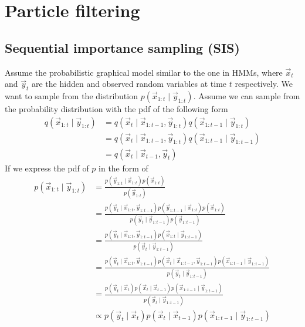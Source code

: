 \section{Particle filtering}
\subsection{Sequential importance sampling (SIS)}
    Assume the probabilistic graphical model similar to the one in HMMs, where $\vec x_t$ and $\vec y_t$ are the hidden and observed random variables at time $t$ respectively. We want to sample from the distribution $p(\vec x_{1:t} \mid \vec y_{1:t})$. Assume we can sample from the probability distribution with the pdf of the following form
    \begin{align}
        q(\vec x_{1:t} \mid \vec y_{1:t})   &= q(\vec x_t \mid \vec x_{1:t - 1}, \vec y_{1:t}) q(\vec x_{1:t-1} \mid \vec y_{1:t}) \\
                                            &= q(\vec x_t \mid \vec x_{1:t - 1}, \vec y_{1:t}) q(\vec x_{1:t-1} \mid \vec y_{1:t - 1}) \\
                                            &= q(\vec x_t \mid \vec x_{t - 1}, \vec y_t)
    \end{align}
    If we express the pdf of $p$ in the form of
    \begin{align}
        p(\vec x_{1:t} \mid \vec y_{1:t})   &= \frac{p(\vec y_{1:t} \mid \vec x_{1:t}) p(\vec x_{1:t})}{p(\vec y_{1:t})} \\
                                            &= \frac{p(\vec y_t \mid \vec x_{1:t}, \vec y_{1:t - 1}) p(\vec y_{1:t - 1} \mid \vec x_{1:t}) p(\vec x_{1:t})}{p(\vec y_t \mid \vec y_{1:t - 1}) p(\vec y_{1:t - 1})} \\
                                            &= \frac{p(\vec y_t \mid \vec x_{1:t}, \vec y_{1:t - 1}) p(\vec x_{1:t} \mid \vec y_{1:t - 1})}{p(\vec y_t \mid \vec y_{1:t - 1})} \\
                                            &= \frac{p(\vec y_t \mid \vec x_{1:t}, \vec y_{1:t - 1}) p(\vec x_t \mid \vec x_{1:t - 1}, \vec y_{1:t - 1}) p(\vec x_{1:t - 1} \mid \vec y_{1:t - 1})}{p(\vec y_t \mid \vec y_{1:t - 1})} \\
                                            &= \frac{p(\vec y_t \mid \vec x_t) p(\vec x_t \mid \vec x_{t - 1}) p(\vec x_{1:t - 1} \mid \vec y_{1:t - 1})}{p(\vec y_t \mid \vec y_{1:t - 1})} \\
                                            &\propto p(\vec y_t \mid \vec x_t) p(\vec x_t \mid \vec x_{t - 1}) p(\vec x_{1:t - 1} \mid \vec y_{1:t - 1})
    \end{align}
